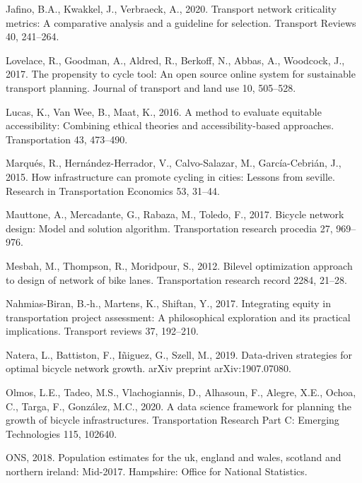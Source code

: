 \documentclass[
]{article}
\begin{document}
\leavevmode\hypertarget{ref-jafino2020transport}{}%
Jafino, B.A., Kwakkel, J., Verbraeck, A., 2020. Transport network
criticality metrics: A comparative analysis and a guideline for
selection. Transport Reviews 40, 241--264.

\leavevmode\hypertarget{ref-lovelace2017propensity}{}%
Lovelace, R., Goodman, A., Aldred, R., Berkoff, N., Abbas, A., Woodcock,
J., 2017. The propensity to cycle tool: An open source online system for
sustainable transport planning. Journal of transport and land use 10,
505--528.

\leavevmode\hypertarget{ref-lucas2016method}{}%
Lucas, K., Van Wee, B., Maat, K., 2016. A method to evaluate equitable
accessibility: Combining ethical theories and accessibility-based
approaches. Transportation 43, 473--490.

\leavevmode\hypertarget{ref-marques2015infrastructure}{}%
Marqués, R., Hernández-Herrador, V., Calvo-Salazar, M., García-Cebrián,
J., 2015. How infrastructure can promote cycling in cities: Lessons from
seville. Research in Transportation Economics 53, 31--44.

\leavevmode\hypertarget{ref-mauttone2017bicycle}{}%
Mauttone, A., Mercadante, G., Rabaza, M., Toledo, F., 2017. Bicycle
network design: Model and solution algorithm. Transportation research
procedia 27, 969--976.

\leavevmode\hypertarget{ref-mesbah2012bilevel}{}%
Mesbah, M., Thompson, R., Moridpour, S., 2012. Bilevel optimization
approach to design of network of bike lanes. Transportation research
record 2284, 21--28.

\leavevmode\hypertarget{ref-nahmias2017integrating}{}%
Nahmias-Biran, B.-h., Martens, K., Shiftan, Y., 2017. Integrating equity
in transportation project assessment: A philosophical exploration and
its practical implications. Transport reviews 37, 192--210.

\leavevmode\hypertarget{ref-natera2019data}{}%
Natera, L., Battiston, F., Iñiguez, G., Szell, M., 2019. Data-driven
strategies for optimal bicycle network growth. arXiv preprint
arXiv:1907.07080.

\leavevmode\hypertarget{ref-olmos2020data}{}%
Olmos, L.E., Tadeo, M.S., Vlachogiannis, D., Alhasoun, F., Alegre, X.E.,
Ochoa, C., Targa, F., González, M.C., 2020. A data science framework for
planning the growth of bicycle infrastructures. Transportation Research
Part C: Emerging Technologies 115, 102640.

\leavevmode\hypertarget{ref-ofn2018population}{}%
ONS, 2018. Population estimates for the uk, england and wales, scotland
and northern ireland: Mid-2017. Hampshire: Office for National
Statistics.
\end{document}
